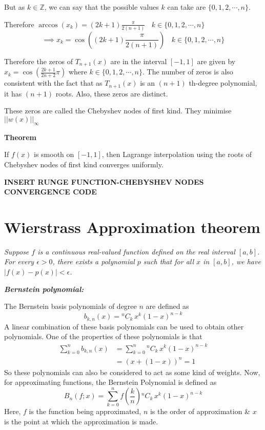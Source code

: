 \documentclass[
]{book}
\begin{document}
But as \(k \in \mathbb{Z}\), we can say that the possible values \(k\) can take are \(\{ 0,1,2,\cdots,n\}\).

Therefore \(\arccos(x_k) = (2k+1)\frac{\pi}{2(n+1)} \ \ \ \ k \in \{ 0,1,2,\cdots,n\}\)
\[\implies x_k = \cos\left( (2k+1)\frac{\pi}{2(n+1)} \right)\ \ \ \ k \in \{ 0,1,2,\cdots,n\}\]

Therefore the zeros of \(T_{n+1}(x)\) are in the interval \([-1,1]\) are given by \(x_k = \cos\left( \frac{2k+1}{2n+2} \pi \right)\) where \(k \in \{ 0,1,2,\cdots,n \}\). The number of zeros is also consistent with the fact that as \(T_{n+1}(x)\) is an \((n+1)\) th-degree polynomial, it has \((n+1)\) roots. Also, these zeros are distinct.

These zeros are called the Chebyshev nodes of first kind. They minimise \(||w(x)||_{\infty}\)

\textbf{Theorem}

If \(f(x)\) is smooth on \([-1,1]\), then Lagrange interpolation using the roots of Chebyshev nodes of first kind converges uniformly.

\textbf{INSERT RUNGE FUNCTION-CHEBYSHEV NODES CONVERGENCE CODE}

\hypertarget{wierstrass-approximation-theorem}{%
\section{Wierstrass Approximation theorem}\label{wierstrass-approximation-theorem}}

\emph{Suppose \(f\) is a continuous real-valued function defined on the real interval \([a,b]\). For every \(\epsilon > 0\), there exists a polynomial \(p\) such that for all \(x\) in \([a,b]\), we have \(|f(x) - p(x)| < \epsilon\).}

\emph{\textbf{Bernstein polynomial:}}

The Bernstein basis polynomials of degree \(n\) are defined as
\begin{equation}
    b_{k,n}(x) = {}^nC_{k}\, x^k (1-x)^{n-k}
\end{equation}
A linear combination of these basis polynomials can be used to obtain other polynomials. One of the properties of these polynomials is that
\begin{equation}
\begin{aligned}
    \sum_{k=0}^n {b_{k,n}(x)} &= \sum_{k=0}^n {{}^nC_{k}\, x^k (1-x)^{n-k}} \\
    &= (x + (1 - x))^n = 1
    \label{equ:property}
\end{aligned}
\end{equation}
So these polynomials can also be considered to act as some kind of weights. Now, for approximating functions, the Bernstein Polynomial is defined as
\begin{equation}
    B_n(f;x) = \sum_{k=0}^n {f\left(\dfrac{k}{n}\right) {}^nC_{k}\, x^k (1-x)^{n-k}}
    \label{eqn:bern}
\end{equation}
Here, \(f\) is the function being approximated, \(n\) is the order of approximation \& \(x\) is the point at which the approximation is made.
\end{document}
